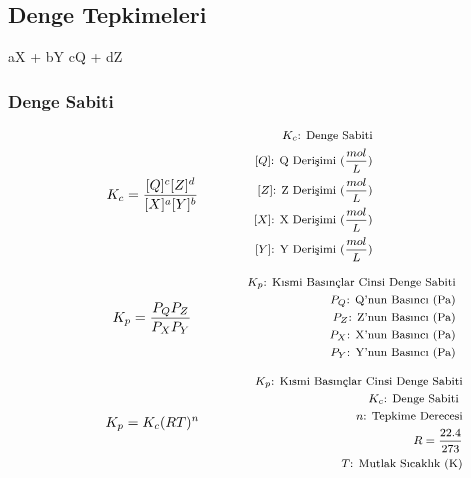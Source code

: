 \subsection{Denge Tepkimeleri}

\begin{chemmath}
    aX + bY
    \reactrarrow{0pt}{1.5cm}{}{}
    cQ + dZ
  \end{chemmath}

\subsubsection*{Denge Sabiti}
\begin{equation}
K_c = \frac{[Q]^c [Z]^d }{[X]^a [Y]^b} \qquad \qquad \parbox{4cm}{\footnotesize$\begin{aligned}
    K_c\text{: Denge Sabiti} \\
    [Q]\text{: Q Derişimi (} \frac{mol}{L} \text{)} \\
    [Z]\text{: Z Derişimi (} \frac{mol}{L} \text{)} \\
    [X]\text{: X Derişimi (} \frac{mol}{L} \text{)} \\
    [Y]\text{: Y Derişimi (} \frac{mol}{L} \text{)}
\end{aligned}$}
\end{equation}

\begin{equation}
K_p = \frac{P_Q P_Z }{P_X P_Y} \qquad \qquad \parbox{4cm}{\footnotesize$\begin{aligned}
    K_p\text{: Kısmi Basınçlar Cinsi Denge Sabiti} \\
    P_Q\text{: Q'nun Basıncı} \text{ (Pa)} \\
    P_Z\text{: Z'nun Basıncı} \text{ (Pa)} \\
    P_X\text{: X'nun Basıncı} \text{ (Pa)} \\
    P_Y\text{: Y'nun Basıncı} \text{ (Pa)}
\end{aligned}$}
\end{equation}

\begin{equation}
K_p = K_c (RT)^n \qquad \qquad \parbox{4cm}{\footnotesize$\begin{aligned}
    K_p\text{: Kısmi Basınçlar Cinsi Denge Sabiti} \\
    K_c\text{: Denge Sabiti } \\
    n\text{: Tepkime Derecesi} \\
    R = \frac{22.4}{273} \\
    T\text{: Mutlak Sıcaklık (K)}
\end{aligned}$}
\end{equation}

